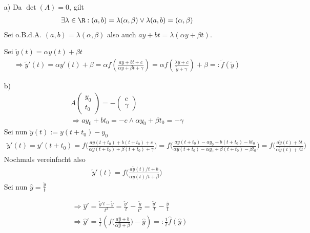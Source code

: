 \begin{solution}
\begin{itemize}
  \item[a)]
  Da $\det(A) = 0$, gilt
  \begin{align*}
    \exists \lambda \in \R: (a,b) = \lambda (\alpha, \beta) \lor \lambda (a,b) = (\alpha, \beta)
  \end{align*}
  Sei o.B.d.A. $(a,b) = \lambda (\alpha, \beta)$ also auch $ay + bt = \lambda (\alpha y + \beta t)$.

  Sei $\tilde{y}(t) = \alpha y(t) + \beta t$
  \begin{align*}
    \Rightarrow \tilde{y}'(t) = \alpha y'(t) + \beta = \alpha f(\frac{ay + bt + c}{\alpha y + \beta t + \gamma}) = \alpha f(\frac{\lambda \tilde{y} + c}{\tilde{y} + \gamma}) + \beta =: \tilde{f}(\tilde{y})
  \end{align*}

  \item[b)]
  \begin{align*}
    A\left(
    \begin{array}{c}
      y_0 \\
      t_0
    \end{array}
    \right) = -\left(
    \begin{array}{c}
      c \\
      \gamma
    \end{array}
    \right) \\
    \Rightarrow ay_0 + bt_0 = -c \land \alpha y_0 + \beta t_0 = -\gamma
  \end{align*}
  Sei nun $\tilde{y}(t) := y(t + t_0 ) - y_0$
  \begin{align*}
    \tilde{y}'(t) = y'(t + t_0 ) = f \bigg(\frac{ay(t+t_0) + b(t+t_0) + c}{\alpha y(t+t_0) + \beta (t+t_0) + \gamma}\bigg) = f\bigg(\frac{ay(t+t_0) - ay_0 + b(t+t_0) - bt_0}{\alpha y(t+t_0) -\alpha y_0 + \beta (t+t_0) - \beta t_0}
    \bigg) = f \bigg(\frac{a\tilde{y}(t) + bt}{\alpha \tilde{y}(t) + \beta t}\bigg)
  \end{align*}
  Nochmals vereinfacht also
  \begin{align*}
    \tilde{y}'(t) = f \bigg(\frac{a\tilde{y}(t)/t + b}{\alpha \tilde{y}(t)/t + \beta }\bigg)
  \end{align*}
  Sei nun $\hat{y} = \frac{\tilde{y}}{t}$

  \begin{align*}
    &\Rightarrow \hat{y}' = \frac{\tilde{y}'t - \tilde{y}}{t^{2}} = \frac{\tilde{y}'}{t} - \frac{\tilde{y}}{t^{2}} = \frac{\tilde{y}'}{t} - \frac{\hat{y}}{t} \\
    &\Rightarrow \hat{y}' = \frac{1}{t} (f \bigg(\frac{a\hat{y} + b}{\alpha \hat{y} + \beta }\bigg) - \hat{y}) =: \frac{1}{t} \hat{f}(\hat{y})
  \end{align*}
\end{itemize}
\end{solution}
